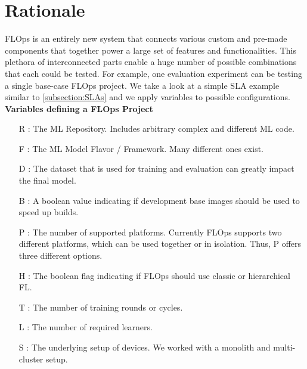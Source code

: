\section{Rationale}
FLOps is an entirely new system that connects various custom and pre-made components that together power a large set of features and functionalities.
This plethora of interconnected parts enable a huge number of possible combinations that each could be tested.
For example, one evaluation experiment can be testing a single base-case FLOps project.
We take a look at a simple SLA example similar to \ref{subsection:SLAs} and we apply variables to possible configurations.
\vspace{5mm}
\newline
\textbf{Variables defining a FLOps Project}
\begin{itemize}
    \item [R]:
        The ML Repository.
        Includes arbitrary complex and different ML code.
    \item [F]:
        The ML Model Flavor / Framework.
        Many different ones exist.
    \item [D]:
        The dataset that is used for training and evaluation can greatly impact the final model.
    \item [B]:
        A boolean value indicating if development base images should be used to speed up builds.
    \item [P]:
        The number of supported platforms.
        Currently FLOps supports two different platforms, which can be used together or in isolation.
        Thus, P offers three different options.
    \item [H]:
        The boolean flag indicating if FLOps should use classic or hierarchical FL.
    \item [T]:
        The number of training rounds or cycles.
    \item [L]:
        The number of required learners.
    \item [S]:
        The underlying setup of devices.
        We worked with a monolith and multi-cluster setup.
\end{itemize}

